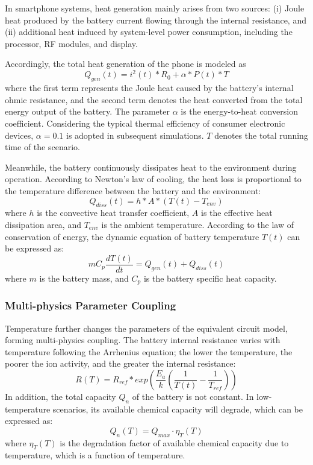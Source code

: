 \documentclass{mcmthesis}
\begin{document}
In smartphone systems, heat generation mainly arises from two sources:
(i) Joule heat produced by the battery current flowing through the internal resistance, and
(ii) additional heat induced by system-level power consumption, including the processor, RF modules, and display.

Accordingly, the total heat generation of the phone is modeled as
\begin{equation}
Q_{gen}(t)=i^2(t)\ast R_{0}+\alpha\ast P(t)\ast T
\end{equation}
where the first term represents the Joule heat caused by the battery’s internal ohmic resistance, and the second term denotes the heat converted from the total energy output of the battery.
The parameter $\alpha$ is the energy-to-heat conversion coefficient. Considering the typical thermal efficiency of consumer electronic devices, $\alpha=0.1$ is adopted in subsequent simulations.
$T$ denotes the total running time of the scenario.

Meanwhile, the battery continuously dissipates heat to the environment during operation.
According to Newton's law of cooling, the heat loss is proportional to the temperature difference between the battery and the environment:
\begin{equation}
Q_{diss}\left(t\right)=h\ast A\ast(T(t)-T_{env})
\end{equation}
where $h$ is the convective heat transfer coefficient, $A$ is the effective heat dissipation area, and $T_{env}$ is the ambient temperature.
According to the law of conservation of energy, the dynamic equation of battery temperature $T(t)$ can be expressed as:
\begin{equation}
mC_p\frac{dT(t)}{dt}=Q_{gen}(t)+Q_{diss}(t)
\end{equation}
where $m$ is the battery mass, and $C_p$ is the battery specific heat capacity.
\subsubsection{Multi-physics Parameter Coupling}
Temperature further changes the parameters of the equivalent circuit model, forming multi-physics coupling.
The battery internal resistance varies with temperature following the Arrhenius equation; the lower the temperature, the poorer the ion activity, and the greater the internal resistance:
\begin{equation}
  R(T)=R_{ref}\ast exp \left( \frac{E_a}{k}(\frac{1}{T(t)}-\frac{1}{T_{ref}}) \right)
\end{equation}
In addition, the total capacity $Q_n$ of the battery is not constant. In low-temperature scenarios, its available chemical capacity will degrade, which can be expressed as:
\begin{equation}
Q_n(T)=Q_{max}\cdot\eta_T(T)
\end{equation}
where $\eta_T(T)$ is the degradation factor of available chemical capacity due to temperature, which is a function of temperature.
\end{document}
